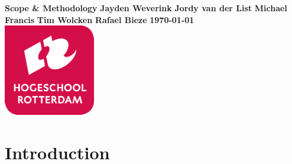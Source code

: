 \documentclass{article}
\begin{document}
\begin{titlepage}
  \centering
    \vfill
    {\bfseries\Huge
	    Scope \& Methodology
        \vskip2cm
      }
      {\bfseries\Large
        Jayden Weverink
        \vskip0cm
      }
      {\bfseries\Large
        Jordy van der List
        \vskip0cm
      }
      {\bfseries\Large
        Michael Francis
        \vskip0cm
      }
      {\bfseries\Large
        Tim Wolcken
        \vskip0cm
      }
      {\bfseries\Large
        Rafael Bieze
        \vskip0cm
      }
      {
        \bfseries\normalsize
        \vskip1cm
        \today\\
    }
    \vfill
    \includegraphics[width=4cm]{logohr.png} %
    \vfill
    \vfill
\end{titlepage}
\newpage
\tableofcontents

\setlength{\parindent}{0em}
\setlength{\parskip}{1em}
\flushleft

\section{Introduction}


\clearpage %


\newpage


\newpage


\newpage


\newpage


\newpage


\newpage


\end{document}
